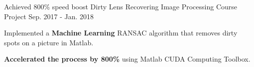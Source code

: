 \begin{cventries}
\cventry
{Achieved 800\% speed boost} %
{Dirty Lens Recovering} %
{Image Processing Course Project} %
{Sep. 2017 - Jan. 2018} %
{ %
\begin{cvitems}
  \item Implemented a \textbf{Machine Learning} RANSAC algorithm that removes dirty spots on a picture in Matlab.
  \item \textbf{Accelerated the process by 800\%} using Matlab CUDA Computing Toolbox.
\end{cvitems}
}

\end{cventries}